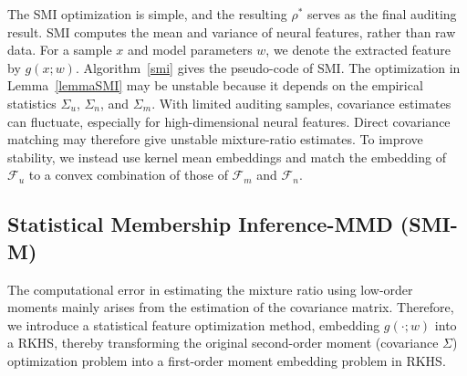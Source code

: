 \documentclass{article}
\theoremstyle{plain}
\theoremstyle{definition}
\theoremstyle{remark}
\begin{document}
\begin{figure}
\noindent{}
\vspace{-1.0em}
\end{figure}
The SMI optimization is simple, and the resulting $\rho^*$ serves as the final auditing result. SMI computes the mean and variance of neural features, rather than raw data. For a sample $x$ and model parameters $w$, we denote the extracted feature by $g(x;w)$. Algorithm~\ref{smi} gives the pseudo-code of SMI. The optimization in Lemma~\ref{lemmaSMI} may be unstable because it depends on the empirical statistics $\Sigma_u$, $\Sigma_n$, and $\Sigma_m$. With limited auditing samples, covariance estimates can fluctuate, especially for high-dimensional neural features. Direct covariance matching may therefore give unstable mixture-ratio estimates. To improve stability, we instead use kernel mean embeddings and match the embedding of $\mathcal F_u$ to a convex combination of those of $\mathcal F_m$ and $\mathcal F_n$.

\subsection{Statistical Membership Inference-MMD (SMI-M)}
The computational error in estimating the mixture ratio using low-order moments mainly arises from the estimation of the covariance matrix.
Therefore, we introduce a statistical feature optimization method, embedding $g(\cdot;w)$ into a RKHS, thereby transforming the original second-order moment (covariance $\Sigma$) optimization problem into a first-order moment embedding problem in RKHS.
\end{document}
